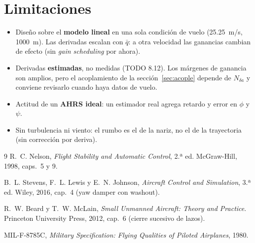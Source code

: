 \documentclass[11pt,a4paper]{article}
\begin{document}
\section{Limitaciones}

\begin{itemize}
  \item Diseño sobre el \textbf{modelo lineal} en una sola condición de vuelo
        (\SI{25.25}{m/s}, \SI{1000}{m}). Las derivadas escalan con $\bar q$:
        a otra velocidad las ganancias cambian de efecto (sin
        \emph{gain scheduling} por ahora).
  \item Derivadas \textbf{estimadas}, no medidas (TODO 8.12). Los márgenes de
        ganancia son amplios, pero el acoplamiento de la
        sección~\ref{sec:acople} depende de $N_{\delta a}$ y conviene
        revisarlo cuando haya datos de vuelo.
  \item Actitud de un \textbf{AHRS ideal}: un estimador real agrega retardo y
        error en $\phi$ y $\psi$.
  \item Sin turbulencia ni viento: el rumbo es el de la nariz, no el de la
        trayectoria (sin corrección por deriva).
\end{itemize}

\begin{thebibliography}{9}
R.~C. Nelson, \emph{Flight Stability and Automatic Control}, 2.ª ed.
McGraw-Hill, 1998, caps.~5 y 9.

B.~L. Stevens, F.~L. Lewis y E.~N. Johnson, \emph{Aircraft Control and
Simulation}, 3.ª ed. Wiley, 2016, cap.~4 (yaw damper con washout).

R.~W. Beard y T.~W. McLain, \emph{Small Unmanned Aircraft: Theory and
Practice}. Princeton University Press, 2012, cap.~6 (cierre sucesivo de lazos).

MIL-F-8785C, \emph{Military Specification: Flying Qualities of Piloted
Airplanes}, 1980.
\end{thebibliography}
\end{document}
